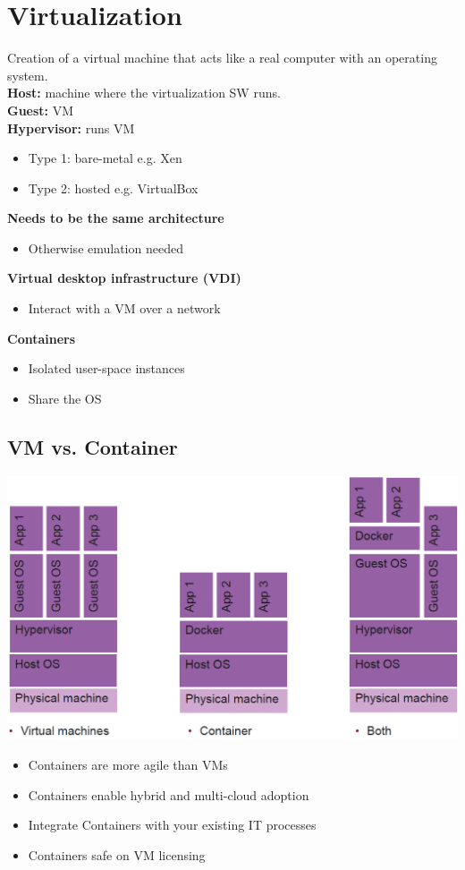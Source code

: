 
\section{Virtualization}
Creation of a virtual machine that acts like a real computer with an operating system.\\
\textbf{Host:} machine where the virtualization SW runs.\\
\textbf{Guest:} VM\\
\textbf{Hypervisor:} runs VM
\begin{itemize}
    \item Type 1: bare-metal e.g. Xen
    \item Type 2: hosted e.g. VirtualBox
\end{itemize}
\textbf{Needs to be the same architecture}
\begin{itemize}
    \item Otherwise emulation needed
\end{itemize}
\textbf{Virtual desktop infrastructure (VDI)}
\begin{itemize}
    \item Interact with a VM over a network
\end{itemize}
\textbf{Containers}
\begin{itemize}
    \item Isolated user-space instances
    \item Share the OS
\end{itemize}

\subsection{VM vs. Container}
\includegraphics[width=\linewidth]{../img/vm_container.png}
\begin{itemize}
    \item Containers are more agile than VMs
    \item Containers enable hybrid and multi-cloud adoption
    \item Integrate Containers with your existing IT processes
    \item Containers safe on VM licensing
\end{itemize}

